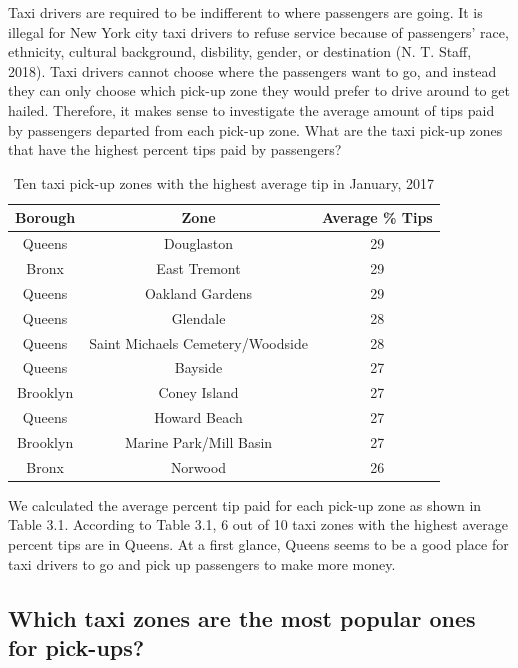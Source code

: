 \documentclass[12pt,twoside]{reedthesis}
\theoremstyle{definition}
\theoremstyle{definition}
\theoremstyle{definition}
\theoremstyle{remark}
\begin{document}
Taxi drivers are required to be indifferent to where passengers are
going. It is illegal for New York city taxi drivers to refuse service
because of passengers' race, ethnicity, cultural background, disbility,
gender, or destination (N. T. Staff, 2018). Taxi drivers cannot choose
where the passengers want to go, and instead they can only choose which
pick-up zone they would prefer to drive around to get hailed. Therefore,
it makes sense to investigate the average amount of tips paid by
passengers departed from each pick-up zone. What are the taxi pick-up
zones that have the highest percent tips paid by passengers?
\begin{table}

\caption{\label{tab:unnamed-chunk-39}Ten taxi pick-up zones with the highest average tip in January, 2017}
\centering
\begin{tabular}[t]{ccc}
\toprule
Borough & Zone & Average \% Tips\\
\midrule
Queens & Douglaston & 29\\
Bronx & East Tremont & 29\\
Queens & Oakland Gardens & 29\\
Queens & Glendale & 28\\
Queens & Saint Michaels Cemetery/Woodside & 28\\
\addlinespace
Queens & Bayside & 27\\
Brooklyn & Coney Island & 27\\
Queens & Howard Beach & 27\\
Brooklyn & Marine Park/Mill Basin & 27\\
Bronx & Norwood & 26\\
\bottomrule
\end{tabular}
\end{table}
We calculated the average percent tip paid for each pick-up zone as
shown in Table 3.1. According to Table 3.1, 6 out of 10 taxi zones with
the highest average percent tips are in Queens. At a first glance,
Queens seems to be a good place for taxi drivers to go and pick up
passengers to make more money.

\subsection{Which taxi zones are the most popular ones for
pick-ups?}\label{which-taxi-zones-are-the-most-popular-ones-for-pick-ups}
\end{document}
